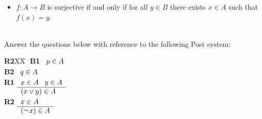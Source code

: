 \documentclass[addpoints]{exam}
\newcommand{\tf}[1][{}]{%
\fillin[#1][0.25in]%
}
\begin{document}
\begin{questions}
{{{\begin{itemize}
\item $f: A \to B$ is surjective if and only if for all $y \in B$ there
exists $x \in A$ such that $f(x) = y$. 
\end{itemize}}}}\\








%
\clearpage
\question\label{q:plpost} Answer the questions below with reference to the following Post
system: 
\begin{tabbing}
{\bf R2}XX \=  \kill
{\bf B1} \>
        \(\begin{array}[t]{l}
        p \in A
        \end{array}\) \\[2ex]
{\bf B2} \>
        \(\begin{array}[t]{l}
        q \in A
        \end{array}\) \\[2ex]
{\bf R1} \>
        \(\begin{array}[t]{l}
        x \in A \;\;\;y \in A \\
        \hline
        (x \lor y) \in A
        \end{array}\) \\[2ex]
{\bf R2} \>
        \(\begin{array}[t]{l}
        x \in A \\
        \hline
        (\mathop{\neg} x) \in A
        \end{array}\) 
\end{tabbing}


\end{questions}
\end{document}

